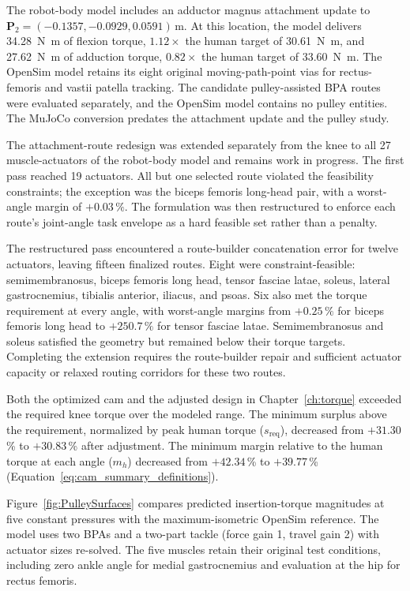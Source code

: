 The robot-body model includes an adductor magnus attachment update to $\mathbf{P}_2=(-0.1357,-0.0929,0.0591)\,\unit{\meter}$. At this location, the model delivers \qty{34.28}{\newton\meter} of flexion torque, $1.12\times$ the human target of \qty{30.61}{\newton\meter}, and \qty{27.62}{\newton\meter} of adduction torque, $0.82\times$ the human target of \qty{33.60}{\newton\meter}. The OpenSim model retains its eight original moving-path-point vias for rectus-femoris and vastii patella tracking. The candidate pulley-assisted BPA routes were evaluated separately, and the OpenSim model contains no pulley entities. The MuJoCo conversion predates the attachment update and the pulley study.

The attachment-route redesign was extended separately from the knee to all 27 muscle-actuators of the robot-body model and remains work in progress. The first pass reached 19 actuators. All but one selected route violated the feasibility constraints; the exception was the biceps femoris long-head pair, with a worst-angle margin of $+0.03\,\%$. The formulation was then restructured to enforce each route's joint-angle task envelope as a hard feasible set rather than a penalty.

The restructured pass encountered a route-builder concatenation error for twelve actuators, leaving fifteen finalized routes. Eight were constraint-feasible: semimembranosus, biceps femoris long head, tensor fasciae latae, soleus, lateral gastrocnemius, tibialis anterior, iliacus, and psoas. Six also met the torque requirement at every angle, with worst-angle margins from $+0.25\,\%$ for biceps femoris long head to $+250.7\,\%$ for tensor fasciae latae. Semimembranosus and soleus satisfied the geometry but remained below their torque targets. Completing the extension requires the route-builder repair and sufficient actuator capacity or relaxed routing corridors for these two routes.

Both the optimized cam and the adjusted design in Chapter~\ref{ch:torque} exceeded the required knee torque over the modeled range. The minimum surplus above the requirement, normalized by peak human torque ($s_{\mathrm{req}}$), decreased from $+31.30$\,\% to $+30.83$\,\% after adjustment. The minimum margin relative to the human torque at each angle ($m_h$) decreased from $+42.34$\,\% to $+39.77$\,\% (Equation~\eqref{eq:cam_summary_definitions}).

Figure~\ref{fig:PulleySurfaces} compares predicted insertion-torque magnitudes at five constant pressures with the maximum-isometric OpenSim reference. The model uses two BPAs and a two-part tackle (force gain 1, travel gain 2) with actuator sizes re-solved. The five muscles retain their original test conditions, including zero ankle angle for medial gastrocnemius and evaluation at the hip for rectus femoris.

